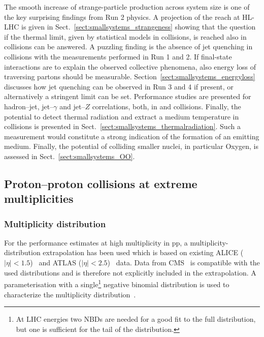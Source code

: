\documentclass[../report.tex]{subfiles}
\begin{document}
The smooth increase of strange-particle production across system size is one of the key surprising findings from Run 2 \pp physics. A projection of the reach at HL-LHC is given in Sect.~\ref{sect:smallsystems_strangeness} showing that the question if the thermal limit, given by statistical models in \PbPb collisions, is reached also in \pp collisions can be answered.
A puzzling finding is the absence of jet quenching in \pPb collisions with the measurements performed in Run 1 and 2. If final-state interactions are to explain the observed collective phenomena, also energy loss of traversing partons should be measurable. 
Section~\ref{sect:smallsystems_energyloss} discusses how jet quenching can be observed in Run 3 and 4 if present, or alternatively a stringent limit can be set. Performance studies are presented for hadron--jet, jet--$\gamma$ and jet--$Z$ correlations, both, in \pPb and \pp collisions.
Finally, the potential to detect thermal radiation and extract a medium temperature in \pPb collisions is presented in Sect.~\ref{sect:smallsystems_thermalradiation}. Such a measurement would constitute a strong indication of the formation of an emitting medium. Finally, the potential of colliding smaller nuclei, in particular Oxygen, is assessed in Sect.~\ref{sect:smallsystems_OO}.

\subsection{Proton--proton collisions at extreme multiplicities}
\label{sect:smallsystems_multiplicity}

\subsubsection{Multiplicity distribution}

For the performance estimates at high multiplicity in pp, a multiplicity-distribution extrapolation has been used which is based on existing ALICE ($|\eta| < 1.5$)~\cite{Adam:2015gka} and ATLAS ($|\eta|< 2.5$)~\cite{Aad:2010ac,Aad:2016xww} data. Data from CMS~\cite{Khachatryan:2010nk} is compatible with the used distributions and is therefore not explicitly included in the extrapolation. A parameterisation with a single\footnote{At LHC energies two NBDs are needed for a good fit to the full distribution, but one is sufficient for the tail of the distribution.} negative binomial distribution is used to characterize the multiplicity distribution~\cite{GrosseOetringhaus:2009kz,ALICE:2017pcy}.
\end{document}
